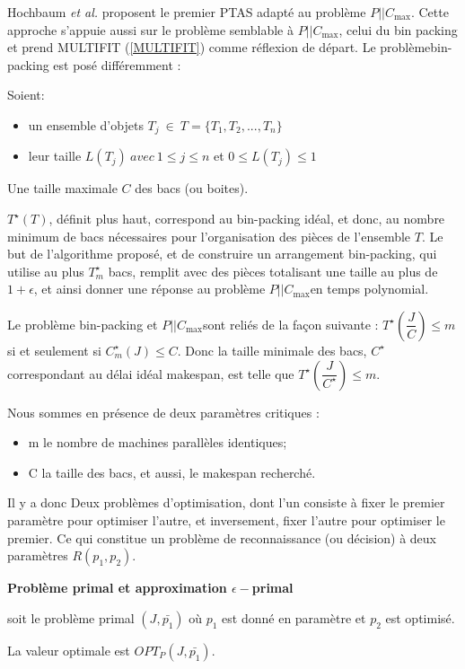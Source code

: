 \documentclass[a4paper,12pt]{report}
\theoremstyle{plain}				%
\theoremstyle{definition}				%
\newcommand\problemGrahamP{$P||C_{\max}$}
\begin{document}
Hochbaum \textit{et al.} \cite{hochbaum1987using} proposent le premier PTAS adapté au problème 
\problemGrahamP. Cette approche s'appuie aussi sur le problème semblable à \problemGrahamP, celui du bin packing et prend MULTIFIT (\ref{MULTIFIT}) comme réflexion de départ. 
Le problèmebin-packing est posé différemment :

Soient:
\begin{itemize}
\item un ensemble d'objets $T_j ~ \in ~ T = \{T_1, T_2, ..., T_n\}$
\item leur taille $L(T_j)~ avec ~ 1 \le j \le n$ et \textbf{$0 \le L(T_j) \le 1$}
\end{itemize}
Une taille maximale $C$ des bacs (ou boites).

$T^{\star}(T)$, définit plus haut, correspond au bin-packing idéal, et donc, 
au nombre minimum de bacs nécessaires pour l'organisation des pièces de l'ensemble $T$.
Le but de l'algorithme proposé, et de construire un arrangement bin-packing, 
qui utilise au plus $T^{\star}_m$ bacs, remplit 
avec des pièces totalisant une taille au plus de $1+ \epsilon$, 
et ainsi donner une réponse au problème \problemGrahamP en temps polynomial.

Le problème bin-packing et \problemGrahamP sont reliés de la façon suivante :
$T^{\star}(\dfrac{J}{C}) \le m$ si et seulement si $C^{\star}_m(J) \le C$. 
Donc la taille minimale des bacs, $C^{\star}$ correspondant au délai idéal makespan, est telle que $T^{\star}(\dfrac{J}{C^{\star}}) \le m$.

Nous sommes en présence de deux paramètres critiques :
\begin{itemize}
\item m le nombre de machines parallèles identiques;
\item C la taille des bacs, et aussi, le makespan recherché.
\end{itemize}
Il y a donc Deux problèmes d'optimisation, 
dont l'un consiste à fixer le premier paramètre pour optimiser l'autre, 
et inversement, fixer l'autre pour optimiser le premier. 
Ce qui constitue un problème de reconnaissance (ou décision) à deux paramètres $R(p_1, p_2)$.

\bigskip

\textbf{Problème primal et approximation $\epsilon-$primal}

soit le problème primal $(J,\bar{p_1})$
où $p_1$ est donné en paramètre et $p_2$ est optimisé.

La valeur optimale est $OPT_P(J,\bar{p_1})$.
\end{document}
